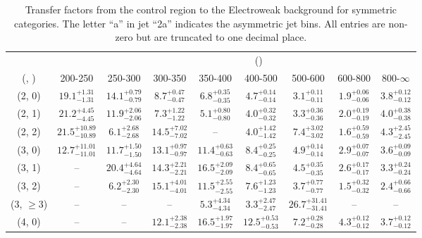 \begin{table}[h!]
\tiny
\centering
\caption{Transfer factors from the \mmj control region to the Electroweak background for symmetric categories. The letter ``a'' in jet \eg ``2a''  indicates the asymmetric jet bins. All entries are non-zero but are truncated to one decimal place.\label{tab:tf_total_mumu_sym}}
\begin{tabular}
{ccccccccc}
	\hline\hline
&	& \multicolumn{8}{c}{\scalht (\gev)} \\ 
	 (\njet,  \nb) & 200-250 & 250-300 & 300-350 & 350-400 & 400-500 & 500-600 & 600-800 & 800-$\infty$ \\ [0.8ex] 
\hline
	(2, 0) & $19.1^{+ 1.31 }_{- 1.31 }$ & $14.1^{+ 0.79 }_{- 0.79 }$ & $8.7^{+ 0.47 }_{- 0.47 }$ & $6.8^{+ 0.35 }_{- 0.35 }$ & $4.7^{+ 0.14 }_{- 0.14 }$ & $3.1^{+ 0.11 }_{- 0.11 }$ & $1.9^{+ 0.06 }_{- 0.06 }$ & $3.8^{+ 0.12 }_{- 0.12 }$ \\[0.5ex] 
	(2, 1) & $21.2^{+ 4.45 }_{- 4.45 }$ & $11.9^{+ 2.06 }_{- 2.06 }$ & $7.3^{+ 1.22 }_{- 1.22 }$ & $5.1^{+ 0.80 }_{- 0.80 }$ & $4.0^{+ 0.32 }_{- 0.32 }$ & $3.3^{+ 0.36 }_{- 0.36 }$ & $2.0^{+ 0.19 }_{- 0.19 }$ & $4.0^{+ 0.38 }_{- 0.38 }$ \\[0.5ex] 
	(2, 2) & $21.5^{+ 10.89 }_{- 10.89 }$ & $6.1^{+ 2.68 }_{- 2.68 }$ & $14.5^{+ 7.02 }_{- 7.02 }$ & -- & $4.0^{+ 1.42 }_{- 1.42 }$ & $7.4^{+ 3.02 }_{- 3.02 }$ & $1.6^{+ 0.59 }_{- 0.59 }$ & $4.3^{+ 2.45 }_{- 2.45 }$ \\[0.5ex] 
	(3, 0) & $12.7^{+ 11.01 }_{- 11.01 }$ & $11.7^{+ 1.50 }_{- 1.50 }$ & $13.1^{+ 0.97 }_{- 0.97 }$ & $11.4^{+ 0.63 }_{- 0.63 }$ & $8.4^{+ 0.25 }_{- 0.25 }$ & $4.9^{+ 0.14 }_{- 0.14 }$ & $2.9^{+ 0.07 }_{- 0.07 }$ & $3.6^{+ 0.09 }_{- 0.09 }$ \\[0.5ex] 
	(3, 1) & -- & $20.4^{+ 4.64 }_{- 4.64 }$ & $14.3^{+ 2.21 }_{- 2.21 }$ & $16.5^{+ 2.09 }_{- 2.09 }$ & $8.4^{+ 0.65 }_{- 0.65 }$ & $4.5^{+ 0.35 }_{- 0.35 }$ & $2.6^{+ 0.17 }_{- 0.17 }$ & $3.3^{+ 0.24 }_{- 0.24 }$ \\[0.5ex] 
	(3, 2) & -- & $6.2^{+ 2.30 }_{- 2.30 }$ & $15.1^{+ 4.01 }_{- 4.01 }$ & $11.5^{+ 2.55 }_{- 2.55 }$ & $7.6^{+ 1.23 }_{- 1.23 }$ & $3.7^{+ 0.77 }_{- 0.77 }$ & $1.5^{+ 0.32 }_{- 0.32 }$ & $2.4^{+ 0.66 }_{- 0.66 }$ \\[0.5ex] 
	(3, $\ge3$) & -- & -- & -- & $5.3^{+ 4.34 }_{- 4.34 }$ & $3.3^{+ 2.47 }_{- 2.47 }$ & $26.7^{+ 31.41 }_{- 31.41 }$ & -- & -- \\[0.5ex] 
	(4, 0) & -- & -- & $12.1^{+ 2.38 }_{- 2.38 }$ & $16.5^{+ 1.97 }_{- 1.97 }$ & $12.5^{+ 0.53 }_{- 0.53 }$ & $7.2^{+ 0.28 }_{- 0.28 }$ & $4.3^{+ 0.12 }_{- 0.12 }$ & $3.7^{+ 0.12 }_{- 0.12 }$ \\[0.5ex] 

\end{tabular}
\end{table}
